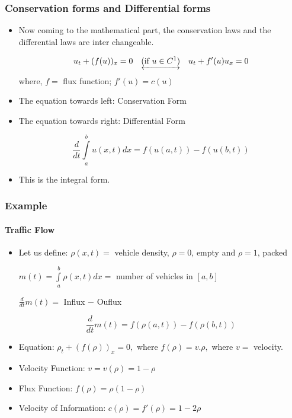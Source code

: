 \documentclass[10pt]{beamer}
\begin{document}
\begin{frame}
    \frametitle{Conservation forms and Differential forms}
    \begin{itemize}
        \item Now coming to the mathematical part, the conservation laws and the differential laws are inter changeable.

    $$
    u_t + (f(u))_x = 0 \quad \underleftrightarrow{(\textrm{if } u \in C^1)} \quad u_t + f'(u)u_x = 0
    $$
    where, $f =$  flux function; $f'(u) = c(u)$

        \item The equation towards left: Conservation Form

        \item The equation towards right: Differential Form


    $$
    \frac d {dt} \int\limits_{a}^{b}u(x, t)dx = f(u(a, t)) - f(u(b, t))
    $$

        \item This is the integral form.
    \end{itemize}
\end{frame}

\begin{frame}
    \frametitle{Example}
    \framesubtitle{Traffic Flow}

    \begin{itemize}
        \item Let us define: $\rho (x, t) =$  vehicle density,  $\rho = 0$, empty and $\rho = 1$, packed

    $m(t) = \int\limits_{a}^{b} \rho(x, t)dx =$  number of vehicles in $[a, b]$

        $\frac{d}{dt} m(t) = $ Influx $-$ Ouflux

        $$
        \frac d {dt} m(t) = f(\rho (a, t)) - f(\rho(b, t))
        $$


         \item Equation: $\rho_t + (f(\rho))_x = 0,$  where $f(\rho) = v.\rho,$ where $v =$  velocity.

         \item Velocity Function: $v = v(\rho) = 1 - \rho$
         \item Flux Function: $f(\rho) = \rho(1-\rho)$
         \item Velocity of Information: $c(\rho) = f'(\rho) = 1-2\rho$
    \end{itemize}
\end{frame}
\end{document}
